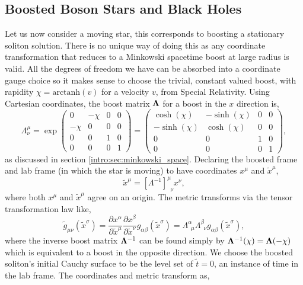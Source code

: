 \subsection{Boosted Boson Stars and Black Holes}\label{boson:sec:boost}
Let us now consider a moving star, this corresponds to boosting a stationary soliton solution. There is no unique way of doing this as any coordinate transformation that reduces to a Minkowski spacetime boost at large radius is valid. All the degrees of freedom we have can be absorbed into a coordinate gauge choice so it makes sense to choose the trivial, constant valued boost, with rapidity $\chi = \mathrm{arctanh} (v)$ for a velocity $v$, from Special Relativity. Using Cartesian coordinates, the boost matrix $\boldsymbol{\Lambda}$ for a boost in the $x$ direction is,
\begin{equation}
\Lambda_\nu^\mu =  \exp\begin{pmatrix} 0 & -\chi & 0& 0 \\ -\chi & 0 & 0 & 0\\ 0 & 0&1&0 \\ 0&0&0&1\end{pmatrix} = \begin{pmatrix} \cosh(\chi) & -\sinh(\chi) & 0& 0 \\ -\sinh(\chi) & \cosh(\chi) & 0 & 0\\ 0 & 0&1&0 \\ 0&0&0&1\end{pmatrix},
\end{equation}
as discussed in section \ref{intro:sec:minkowski_space}. Declaring the boosted frame and lab frame (in which the star is moving) to have coordinates $x^\mu$ and $\tilde{x}^\mu$, 
\begin{equation}
\tilde{x}^\mu = [\Lambda^{-1}]^{\mu}_{\,\,\,\nu}x^{\nu},
\end{equation}
where both $x^\mu$ and $\tilde{x}^\mu$ agree on an origin. The metric transforms via the tensor transformation law like,
\begin{equation}
\tilde{g}_{\mu\nu}(\tilde{x}^\sigma)= \frac{\partial x^\alpha}{\partial \tilde{x}^\mu}  \frac{\partial x^\beta}{\partial \tilde{x}^\nu}g_{\alpha\beta}(\tilde{x}^\sigma) = \Lambda^\alpha_{\,\,\,\mu}\Lambda^\beta_{\,\,\,\nu} g_{\alpha\beta}(\tilde{x}^\sigma),
\end{equation}
where the inverse boost matrix $\boldsymbol{\Lambda}^{-1}$ can be found simply by $\boldsymbol{\Lambda}^{-1}(\chi) = \boldsymbol{\Lambda}(-\chi)$ which is equivalent to a boost in the opposite direction.
We choose the boosted soliton's initial Cauchy surface to be the level set of $\tilde{t}=0$, an instance of time in the lab frame. The coordinates and metric transform as,
